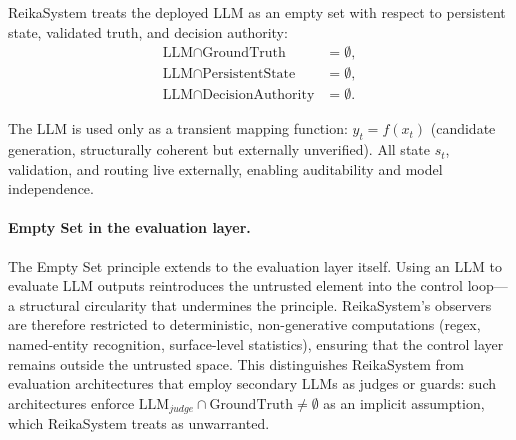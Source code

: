 \documentclass[11pt,a4paper]{article}
\begin{document}
ReikaSystem treats the deployed LLM as an empty set with respect to persistent state,
validated truth, and decision authority:
\begin{align}
\text{LLM} \cap \text{GroundTruth}      &= \emptyset, \label{eq:es1}\\
\text{LLM} \cap \text{PersistentState}  &= \emptyset, \label{eq:es2}\\
\text{LLM} \cap \text{DecisionAuthority}&= \emptyset. \label{eq:es3}
\end{align}

The LLM is used only as a transient mapping function:
$y_t = f(x_t)$ (candidate generation, structurally coherent but externally unverified).
All state $s_t$, validation, and routing live externally, enabling auditability and
model independence.

\paragraph{Empty Set in the evaluation layer.}
The Empty Set principle extends to the evaluation layer itself.
Using an LLM to evaluate LLM outputs reintroduces the untrusted element into the
control loop---a structural circularity that undermines the principle.
ReikaSystem's observers are therefore restricted to deterministic, non-generative
computations (regex, named-entity recognition, surface-level statistics), ensuring
that the control layer remains outside the untrusted space.
This distinguishes ReikaSystem from evaluation architectures that employ secondary
LLMs as judges or guards: such architectures enforce
$\text{LLM}_{judge} \cap \text{GroundTruth} \neq \emptyset$
as an implicit assumption, which ReikaSystem treats as unwarranted.
\end{document}
